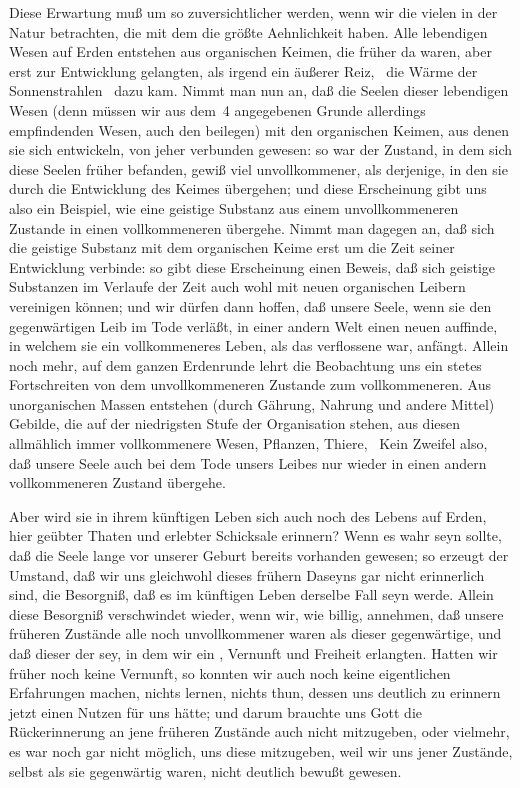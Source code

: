 \begin{aufza}
\item Diese Erwartung muß um so zuversichtlicher werden, wenn wir die vielen  in der Natur betrachten, die mit dem  die größte Aehnlichkeit haben. Alle lebendigen Wesen auf Erden entstehen aus organischen Keimen, die früher da waren, aber erst zur Entwicklung gelangten, als irgend ein äußerer Reiz, \zB\ die Wärme der Sonnenstrahlen \udgl\ dazu kam. Nimmt man nun an, daß die Seelen dieser lebendigen Wesen (denn  müssen wir aus dem \no\,4 angegebenen Grunde allerdings  empfindenden Wesen, auch den  beilegen) mit den organischen Keimen, aus denen sie sich entwickeln, von jeher verbunden gewesen: so war der Zustand, in dem sich diese Seelen früher befanden, gewiß viel unvollkommener, als derjenige, in den sie durch die Entwicklung des Keimes übergehen; und diese Erscheinung gibt uns also ein Beispiel, wie eine geistige Substanz aus einem unvollkommeneren Zustande in einen vollkommeneren übergehe. Nimmt man dagegen an, daß sich die geistige Substanz mit dem organischen Keime erst um die Zeit seiner Entwicklung verbinde: so gibt diese Erscheinung einen Beweis, daß sich geistige Substanzen im Verlaufe der Zeit auch wohl mit neuen organischen Leibern vereinigen können; und wir dürfen dann hoffen, daß unsere Seele, wenn sie den gegenwärtigen Leib im Tode verläßt, in einer andern Welt einen neuen auffinde, in welchem sie ein vollkommeneres Leben, als das verflossene war, anfängt. Allein noch mehr, auf dem ganzen Erdenrunde lehrt die Beobachtung uns ein stetes Fortschreiten von dem unvollkommeneren Zustande zum vollkommeneren. Aus unorganischen Massen entstehen (durch Gährung, Nahrung und andere Mittel) Gebilde, die auf der niedrigsten Stufe der Organisation stehen, aus diesen allmählich immer vollkommenere Wesen, Pflanzen, Thiere, \usw\ Kein Zweifel also, daß unsere Seele auch bei dem Tode unsers Leibes nur wieder in einen andern vollkommeneren Zustand übergehe.
\item Aber wird sie in ihrem künftigen Leben sich auch noch des Lebens auf Erden, hier geübter Thaten und erlebter Schicksale erinnern? Wenn es wahr seyn sollte, daß die Seele lange vor unserer Geburt bereits vorhanden gewesen; so erzeugt der Umstand, daß wir uns gleichwohl dieses frühern Daseyns gar nicht erinnerlich sind, die Besorgniß, daß es im künftigen Leben derselbe Fall seyn werde. Allein diese Besorgniß verschwindet wieder, wenn wir, wie billig, annehmen, daß unsere früheren Zustände alle noch unvollkommener waren als dieser gegenwärtige, und daß dieser der  sey, in dem wir ein , Vernunft und Freiheit erlangten. Hatten wir früher noch keine Vernunft, so konnten wir auch noch keine eigentlichen Erfahrungen machen, nichts lernen, nichts thun, dessen uns deutlich zu erinnern jetzt einen Nutzen für uns hätte; und darum brauchte uns Gott die Rückerinnerung an jene früheren Zustände auch nicht mitzugeben, oder vielmehr, es war noch gar nicht möglich, uns diese mitzugeben, weil wir uns jener Zustände, selbst als sie gegenwärtig waren, nicht deutlich bewußt gewesen.

\end{aufza}
